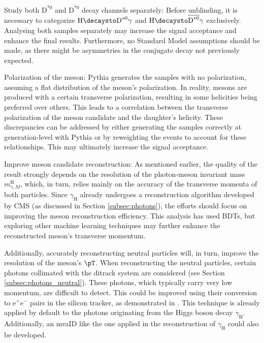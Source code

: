 \begin{myitemlist}
    \item[Study both $\text{D}^{*0}$ and $\overline{\text{D}^{*0}}$ decay channels separately:] Before unblinding, it is necessary to categorize $\text{H}\decaysto \text{D}^{*0}\gamma$ and $\text{H}\decaysto \overline{\text{D}^{*0}}\gamma$ exclusively. Analysing both samples separately may increase the signal acceptance and enhance the final results. Furthermore, no Standard Model assumptions should be made, as there might be asymmetries in the conjugate decay not previously expected.
    
    \item[Polarization of the meson:] Pythia generates the samples with no polarization, assuming a flat distribution of the meson's polarization. In reality, mesons are produced with a certain transverse polarization, resulting in some helicities being preferred over others. This leads to a correlation between the transverse polarization of the meson candidate and the daughter's helicity. These discrepancies can be addressed by either generating the samples correctly at generation-level with Pythia or by reweighting the events to account for these relationships. This may ultimately increase the signal acceptance.
    
    \item[Improve meson candidate reconstruction:] As mentioned earlier, the quality of the result \linebreak strong\-ly depends on the resolution of the photon-meson invariant mass $m^{\text{H}}_{\gamma, M}$, which, in turn, relies mainly on the accuracy of the transverse momenta of both particles. Since $\gamma_{\text{H}}$ already undergoes a reconstruction algorithm developed by CMS (as discussed in Section \ref{subsec:photons}), the efforts should focus on improving the meson reconstruction efficiency. This analysis has used BDTs, but exploring other machine learning techniques may further enhance the reconstructed meson's transverse momentum.
    
    Additionally, accurately reconstructing neutral particles will, in turn, improve the resolution of the meson's $\pT$. When reconstructing the neutral particles, certain photons collimated with the ditrack system are considered (see Section \ref{subsec:photons_neutral}). These photons, which typically carry very low momentum, are difficult to detect. This could be improved using their conversion to e$^+$e$^-$ pairs in the silicon tracker, as demonstrated in \cite{CMS:2018vgf}. This technique is already applied by default to the photons originating from the Higgs boson decay $\gamma_{\text{H}}$. Additionally, an mvaID like the one applied in the reconstruction of $\gamma_{\text{H}}$ could also be developed.
    

\end{myitemlist}
